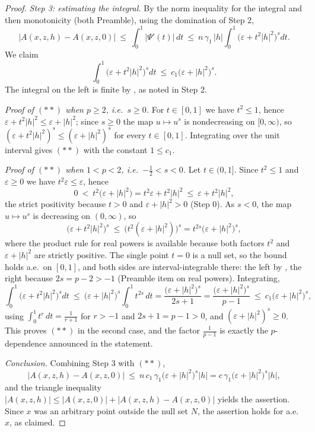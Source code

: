 \begin{proof}
\emph{Step 3: estimating the integral.}  By the norm inequality for the
integral and then monotonicity (both Preamble), using the domination of
Step 2,
\[
\bigl|A(x,z,h)-A(x,z,0)\bigr|\ \le\ \int_0^1|\Psi'(t)|\,dt
\ \le\ n\,\gamma_1\,|h|\int_0^1\bigl(\varepsilon+t^2|h|^2\bigr)^{s}dt .
\]
We claim
\[
\int_0^1\bigl(\varepsilon+t^2|h|^2\bigr)^{s}dt
\ \le\ c_1\bigl(\varepsilon+|h|^2\bigr)^{s} .
\tag{$**$}
\]
The integral on the left is finite by , as
noted in Step 2.

\emph{Proof of $(**)$ when $p\ge2$, i.e.\ $s\ge0$.}  For $t\in[0,1]$ we have
$t^2\le1$, hence $\varepsilon+t^2|h|^2\le\varepsilon+|h|^2$; since $s\ge0$ the
map $u\mapsto u^{s}$ is nondecreasing on $[0,\infty)$, so
$(\varepsilon+t^2|h|^2)^{s}\le(\varepsilon+|h|^2)^{s}$ for every $t\in[0,1]$.
Integrating over the unit interval gives $(**)$ with the constant $1\le c_1$.

\emph{Proof of $(**)$ when $1<p<2$, i.e.\ $-\tfrac12<s<0$.}  Let
$t\in(0,1]$.  Since $t^2\le1$ and $\varepsilon\ge0$ we have
$t^2\varepsilon\le\varepsilon$, hence
\[
0\ <\ t^2\bigl(\varepsilon+|h|^2\bigr)=t^2\varepsilon+t^2|h|^2
\ \le\ \varepsilon+t^2|h|^2 ,
\]
the strict positivity because $t>0$ and $\varepsilon+|h|^2>0$ (Step 0).  As
$s<0$, the map $u\mapsto u^{s}$ is decreasing on $(0,\infty)$, so
\[
\bigl(\varepsilon+t^2|h|^2\bigr)^{s}
\ \le\ \bigl(t^2(\varepsilon+|h|^2)\bigr)^{s}
= t^{2s}\bigl(\varepsilon+|h|^2\bigr)^{s} ,
\]
where the product rule for real powers is available because both factors
$t^2$ and $\varepsilon+|h|^2$ are strictly positive.  The single point $t=0$
is a null set, so the bound holds a.e.\ on $[0,1]$, and both sides are
interval-integrable there: the left by , the
right because $2s=p-2>-1$ (Preamble item on real powers).  Integrating,
\[
\int_0^1\bigl(\varepsilon+t^2|h|^2\bigr)^{s}dt
\ \le\ \bigl(\varepsilon+|h|^2\bigr)^{s}\int_0^1t^{2s}\,dt
=\frac{\bigl(\varepsilon+|h|^2\bigr)^{s}}{2s+1}
=\frac{\bigl(\varepsilon+|h|^2\bigr)^{s}}{p-1}
\ \le\ c_1\bigl(\varepsilon+|h|^2\bigr)^{s},
\]
using $\int_0^1t^{r}\,dt=\frac1{r+1}$ for $r>-1$ and $2s+1=p-1>0$, and
$(\varepsilon+|h|^2)^{s}\ge0$.  This proves $(**)$ in the second case, and the
factor $\frac1{p-1}$ is exactly the $p$-dependence announced in the statement.

\emph{Conclusion.}  Combining Step 3 with $(**)$,
\[
\bigl|A(x,z,h)-A(x,z,0)\bigr|
\ \le\ n\,c_1\,\gamma_1\bigl(\varepsilon+|h|^2\bigr)^{s}|h|
= c\,\gamma_1\bigl(\varepsilon+|h|^2\bigr)^{s}|h| ,
\]
and the triangle inequality $|A(x,z,h)|\le|A(x,z,0)|+|A(x,z,h)-A(x,z,0)|$
yields the assertion.  Since $x$ was an arbitrary point outside the null set
$N$, the assertion holds for a.e.\ $x$, as claimed.
\end{proof}
